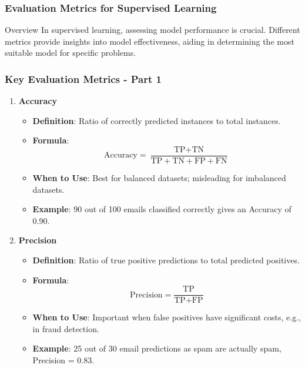\documentclass[aspectratio=169]{beamer}
\begin{document}
\begin{frame}[fragile]
    \frametitle{Evaluation Metrics for Supervised Learning}
    \begin{block}{Overview}
        In supervised learning, assessing model performance is crucial. Different metrics provide insights into model effectiveness, aiding in determining the most suitable model for specific problems.
    \end{block}
\end{frame}

\begin{frame}[fragile]
    \frametitle{Key Evaluation Metrics - Part 1}
    \begin{enumerate}
        \item \textbf{Accuracy}
        \begin{itemize}
            \item \textbf{Definition}: Ratio of correctly predicted instances to total instances.
            \item \textbf{Formula}:
            \begin{equation}
            \text{Accuracy} = \frac{\text{TP} + \text{TN}}{\text{TP} + \text{TN} + \text{FP} + \text{FN}}
            \end{equation}
            \item \textbf{When to Use}: Best for balanced datasets; misleading for imbalanced datasets.
            \item \textbf{Example}: 90 out of 100 emails classified correctly gives an Accuracy of 0.90.
        \end{itemize}
        
        \item \textbf{Precision}
        \begin{itemize}
            \item \textbf{Definition}: Ratio of true positive predictions to total predicted positives.
            \item \textbf{Formula}:
            \begin{equation}
            \text{Precision} = \frac{\text{TP}}{\text{TP} + \text{FP}}
            \end{equation}
            \item \textbf{When to Use}: Important when false positives have significant costs, e.g., in fraud detection.
            \item \textbf{Example}: 25 out of 30 email predictions as spam are actually spam, Precision = 0.83.
        \end{itemize}
    \end{enumerate}
\end{frame}
\end{document}
